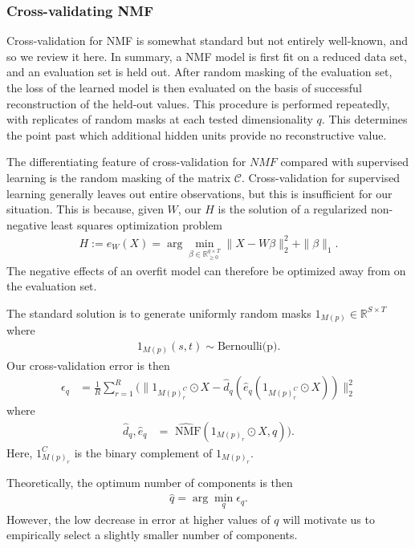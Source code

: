 \subsubsection{Cross-validating NMF}

Cross-validation for NMF is somewhat standard but not entirely well-known, and so we review it here.
In summary, a NMF model is first fit on a reduced data set, and an evaluation set is held out.
After random masking of the evaluation set, the loss of the learned model is then evaluated on the basis of successful reconstruction of the held-out values.
This procedure is performed repeatedly, with replicates of random masks at each tested dimensionality $q$.
This determines the point past which additional hidden units provide no reconstructive value.

The differentiating feature of cross-validation for $NMF$ compared with supervised learning is the random masking of the matrix $\mathcal C$.
Cross-validation for supervised learning generally leaves out entire observations, but this is insufficient for our situation.
This is because, given $W$, our $H$ is the solution of a regularized non-negative least squares optimization problem
\begin{align*}
H := e_W(X) = \arg \min_{\beta \in \mathbb R_{\geq 0}^{q \times T}} \|X - W \beta\|_2^2 + \|\beta\|_1.
\end{align*}
The negative effects of an overfit model can therefore be optimized away from on the evaluation set.

The standard solution is to generate uniformly random masks $1_{M(p)} \in \mathbb R^{S \times T}$ where
\begin{align*}
1_{M(p)} (s,t) \sim \text{Bernoulli(p)}.
\end{align*}
Our cross-validation error is then
\begin{align*}
\epsilon_q &= \frac{1}{R} \sum_{r = 1}^R (\|1_{M(p)_r^C} \odot X - \widehat d_q(\widehat e_q (1_{M(p)_r^C} \odot X ))\|_2^2 
\end{align*}
where
\begin{align*}
\widehat d_q, \widehat e_q &= \widehat{\text{ NMF}}(1_{M(p)_r} \odot X, q)).
\end{align*}
Here, $1_{M(p)_r}^C$ is the binary complement of $1_{M(p)_r}$.

Theoretically, the optimum number of components is then
\begin{align*}
    \widehat q = \arg \min_q \epsilon_q.
\end{align*}
However, the low decrease in error at higher values of $q$ will motivate us to empirically select a slightly smaller number of components.

